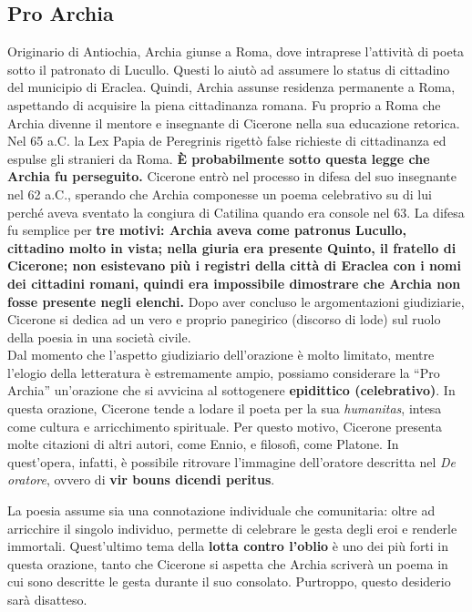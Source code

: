 \documentclass[10pt,a4paper]{article}
\begin{document}
\subsection*{Pro Archia}

Originario di Antiochia, Archia giunse a Roma, dove intraprese l’attività di poeta sotto il patronato di Lucullo.
Questi lo aiutò ad assumere lo status di cittadino del municipio di Eraclea. Quindi, Archia assunse residenza
permanente a Roma, aspettando di acquisire la piena cittadinanza romana. Fu proprio a Roma che Archia
divenne il mentore e insegnante di Cicerone nella sua educazione retorica. Nel 65 a.C. la Lex Papia de Peregrinis
rigettò false richieste di cittadinanza ed espulse gli stranieri da Roma. \textbf{È probabilmente sotto questa legge che
Archia fu perseguito.} Cicerone entrò nel processo in difesa del suo insegnante nel 62 a.C., sperando che Archia
componesse un poema celebrativo su di lui perché aveva sventato la congiura di Catilina quando era console nel
63.
La difesa fu semplice per \textbf{tre motivi: Archia aveva come patronus Lucullo, cittadino molto in vista; nella giuria
era presente Quinto, il fratello di Cicerone; non esistevano più i registri della città di Eraclea con i nomi dei
cittadini romani, quindi era impossibile dimostrare che Archia non fosse presente negli elenchi.} Dopo aver
concluso le argomentazioni giudiziarie, Cicerone si dedica ad un vero e proprio panegirico (discorso di lode) sul
ruolo della poesia in una società civile.\\

 Dal momento che l’aspetto giudiziario dell’orazione è molto limitato,
mentre l’elogio della letteratura è estremamente ampio, possiamo considerare la “Pro Archia” un’orazione che si
avvicina al sottogenere \textbf{epidittico (celebrativo)}. In questa orazione, Cicerone tende a lodare il poeta per la sua \textit{humanitas}, intesa come cultura e arricchimento spirituale. Per questo motivo, Cicerone presenta molte citazioni di altri autori, come Ennio, e filosofi, come Platone. In quest'opera, infatti, è possibile ritrovare l'immagine dell'oratore descritta nel \textit{De oratore}, ovvero di \textbf{vir bouns dicendi peritus}.

La poesia assume sia una connotazione individuale che comunitaria: oltre ad arricchire il singolo individuo, permette di celebrare le gesta degli eroi e renderle immortali. Quest'ultimo tema della \textbf{lotta contro l'oblio} è uno dei più forti in questa orazione, tanto che Cicerone si aspetta che Archia scriverà un poema in cui sono descritte le gesta durante il suo consolato. Purtroppo, questo desiderio sarà disatteso.
\end{document}

